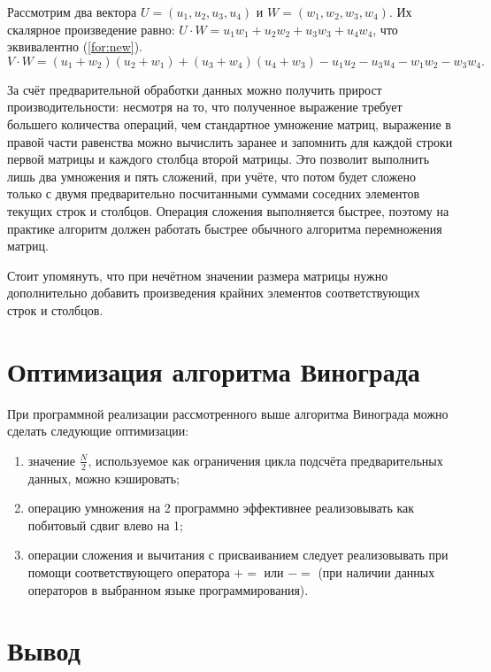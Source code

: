 Рассмотрим два вектора $U = (u_1, u_2, u_3, u_4)$ и $W = (w_1, w_2, w_3, w_4)$.
Их скалярное произведение равно: $U \cdot W = u_1w_1 + u_2w_2 + u_3w_3 + u_4w_4$, что эквивалентно (\ref{for:new}).
\begin{equation}
	\label{for:new}
	V \cdot W = (u_1 + w_2)(u_2 + w_1) + (u_3 + w_4)(u_4 + w_3) - u_1u_2 - u_3u_4 - w_1w_2 - w_3w_4.
\end{equation}

За счёт предварительной обработки данных можно получить прирост производительности: несмотря на то, что  полученное выражение требует большего количества операций, чем стандартное умножение матриц, выражение в правой части равенства можно вычислить заранее и запомнить для каждой строки первой матрицы и каждого столбца второй матрицы. 
Это позволит выполнить лишь два умножения и пять сложений, при учёте, что потом будет сложено только с двумя предварительно посчитанными суммами соседних элементов текущих строк и столбцов. 
Операция сложения выполняется быстрее, поэтому на практике алгоритм должен работать быстрее обычного алгоритма перемножения матриц.

Стоит упомянуть, что при нечётном значении размера матрицы нужно дополнительно добавить произведения крайних элементов соответствующих строк и столбцов.

\section{Оптимизация алгоритма Винограда}

При программной реализации рассмотренного выше алгоритма Винограда можно сделать следующие оптимизации:
\begin{enumerate}[label=\arabic*)]
	\item значение $\frac{N}{2}$, используемое как ограничения цикла подсчёта предварительных данных, можно кэшировать;
	\item операцию умножения на 2 программно эффективнее реализовывать как побитовый сдвиг влево на 1;
	\item операции сложения и вычитания с присваиванием следует реализовывать при помощи соответствующего оператора $+=$ или $-=$ (при наличии данных операторов в выбранном языке программирования).
 \end{enumerate}


\section*{Вывод}

